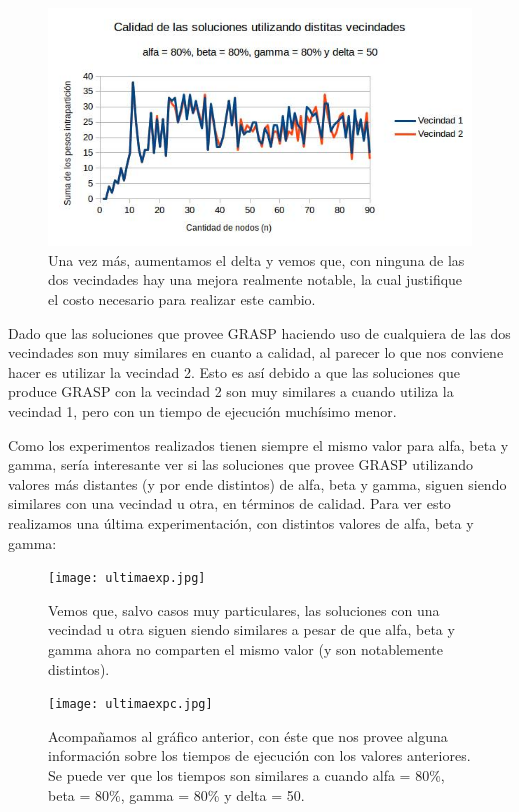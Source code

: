 \documentclass[a4paper]{article}
\begin{document}
\begin{figure}[H]
\centering
\includegraphics[scale=0.7]{80808050.jpg}\caption{Una vez más, aumentamos el delta y vemos que, con ninguna de las dos vecindades hay una mejora realmente notable, la cual justifique el costo necesario para realizar este cambio.}
\end{figure}
\noindent Dado que las soluciones que provee GRASP haciendo uso de cualquiera de las dos vecindades son muy similares en cuanto a calidad, al parecer lo que nos conviene hacer es utilizar la vecindad 2. Esto es así debido a que las soluciones que produce GRASP con la vecindad 2 son muy similares a cuando utiliza la vecindad 1, pero con un tiempo de ejecución muchísimo menor.

Como los experimentos realizados tienen siempre el mismo valor para alfa, beta y gamma, sería interesante ver si las soluciones que provee GRASP utilizando valores más distantes (y por ende distintos) de alfa, beta y gamma, siguen siendo similares con una vecindad u otra, en términos de calidad.
\newline Para ver esto realizamos una última experimentación, con distintos valores de alfa, beta y gamma:

\begin{figure}[H]
\centering
\texttt{[image: ultimaexp.jpg]}\caption{Vemos que, salvo casos muy particulares, las soluciones con una vecindad u otra siguen siendo similares a pesar de que alfa, beta y gamma ahora no comparten el mismo valor (y son notablemente distintos).}
\end{figure}

\begin{figure}[H]
\centering
\texttt{[image: ultimaexpc.jpg]}\caption{Acompañamos al gráfico anterior, con éste que nos provee alguna información sobre los tiempos de ejecución con los valores anteriores. Se puede ver que los tiempos son similares a cuando alfa = 80\%, beta = 80\%, gamma = 80\% y delta = 50.}
\end{figure}
\end{document}
